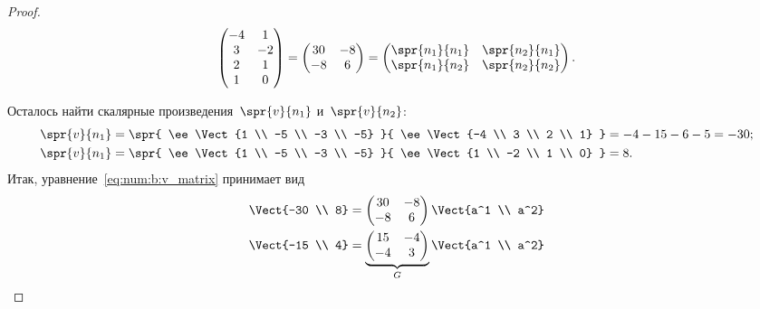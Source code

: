 \begin{proof}
\begin{align*}
		\begin{pmatrix}
			-4 & 1 \\
			3 & -2 \\
			2 & 1 \\
			1 & 0
		\end{pmatrix}
		=
		\begin{pmatrix}
			30 & -8 \\
			-8 & 6
		\end{pmatrix}
		=
		\begin{pmatrix}
			\spr{n_1}{n_1} & \spr{n_2}{n_1} \\
			\spr{n_1}{n_2} & \spr{n_2}{n_2}
		\end{pmatrix}
		.
	\end{align*}

	Осталось найти скалярные произведения~$\spr{v}{n_1}$ и~$\spr{v}{n_2}$:
	\begin{align*}
		\spr{v}{n_1} &=
		\spr{
			\ee
			\Vect{1 \\ -5 \\ -3 \\ -5}
		}{
			\ee
			\Vect{-4 \\ 3 \\ 2 \\ 1}
		}
		=
		-4 - 15 - 6 - 5 = -30;
		\\
		\spr{v}{n_1} &=
		\spr{
			\ee
			\Vect{1 \\ -5 \\ -3 \\ -5}
		}{
			\ee
			\Vect{1 \\ -2 \\ 1 \\ 0}
		}
		=
		8
		.
	\end{align*}
	Итак, уравнение~\eqref{eq:num:b:v_matrix} принимает вид
	\begin{align*}
		\Vect{-30 \\ 8}
		&=
		\begin{pmatrix}
			30 & -8 \\
			-8 & 6
		\end{pmatrix}
		\Vect{a^1 \\ a^2}
		\\
		\Vect{-15 \\ 4}
		&=
		\underbrace{
			\begin{pmatrix}
				15 & -4 \\
				-4 & 3
			\end{pmatrix}
		}_{G}
		\Vect{a^1 \\ a^2}
	\end{align*}

\end{proof}
